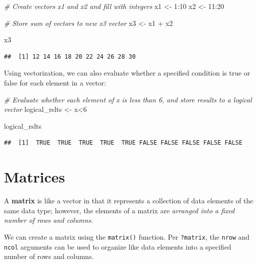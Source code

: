 \documentclass[
]{book}
\newenvironment{Shaded}{\begin{snugshade}}{\end{snugshade}}
\newcommand{\CommentTok}[1]{\textcolor[rgb]{0.56,0.35,0.01}{\textit{#1}}}
\newcommand{\DecValTok}[1]{\textcolor[rgb]{0.00,0.00,0.81}{#1}}
\newcommand{\NormalTok}[1]{#1}
\newcommand{\OtherTok}[1]{\textcolor[rgb]{0.56,0.35,0.01}{#1}}
\newcommand{\SpecialCharTok}[1]{\textcolor[rgb]{0.00,0.00,0.00}{#1}}
\begin{document}
\begin{Shaded}
\begin{Highlighting}[]
\CommentTok{\# Create vectors x1 and x2 and fill with integers}
\NormalTok{x1 }\OtherTok{\textless{}{-}} \DecValTok{1}\SpecialCharTok{:}\DecValTok{10}
\NormalTok{x2 }\OtherTok{\textless{}{-}} \DecValTok{11}\SpecialCharTok{:}\DecValTok{20}

\CommentTok{\# Store sum of vectors to new x3 vector}
\NormalTok{x3 }\OtherTok{\textless{}{-}}\NormalTok{ x1 }\SpecialCharTok{+}\NormalTok{ x2}

\NormalTok{x3}
\end{Highlighting}
\end{Shaded}

\begin{verbatim}
##  [1] 12 14 16 18 20 22 24 26 28 30
\end{verbatim}

Using vectorization, we can also evaluate whether a specified condition is true or false for each element in a vector:

\begin{Shaded}
\begin{Highlighting}[]
\CommentTok{\# Evaluate whether each element of x is less than 6, and store results to a logical vector}
\NormalTok{logical\_rslts }\OtherTok{\textless{}{-}}\NormalTok{ x}\SpecialCharTok{\textless{}}\DecValTok{6}

\NormalTok{logical\_rslts}
\end{Highlighting}
\end{Shaded}

\begin{verbatim}
##  [1]  TRUE  TRUE  TRUE  TRUE  TRUE FALSE FALSE FALSE FALSE FALSE
\end{verbatim}

\hypertarget{matrices}{%
\section{Matrices}\label{matrices}}

A \textbf{matrix} is like a vector in that it represents a collection of data elements of the same data type; however, the elements of a matrix are \emph{arranged into a fixed number of rows and columns}.

We can create a matrix using the \texttt{matrix()} function. Per \texttt{?matrix}, the \texttt{nrow} and \texttt{ncol} arguments can be used to organize like data elements into a specified number of rows and columns.
\end{document}
